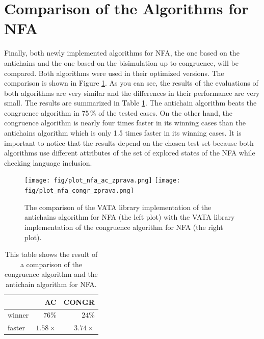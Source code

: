 \section{Comparison of the Algorithms for NFA}
Finally, both newly implemented algorithms for NFA, the one based on the antichains and the one based on the bisimulation up to congruence, will be compared.
Both algorithms were used in their optimized versions.
The comparison is shown in Figure \ref{fig:figPlotNFA}.
As you can see, the results of the evaluations of both algorithms are very similar and the differences in their performance are very small. 
The results are summarized in Table \ref{tabNFA}. The antichain algorithm beats the congruence algorithm in 75\,\% of
the tested cases. On the other hand, the congruence algorithm is nearly four times faster in its winning cases than the antichains algorithm which is
only 1.5 times faster in its winning cases. 
It is important to notice that the results depend on the chosen test set because both algorithms use different attributes
of the set of explored states of the NFA while checking language inclusion.

\begin{figure}[bt]
\begin{center}
\texttt{[image: fig/plot\_nfa\_ac\_zprava.png]}
\texttt{[image: fig/plot\_nfa\_congr\_zprava.png]}
\caption{The comparison of the VATA library implementation of the antichains algorithm for NFA (the left plot)
    with the VATA library implementation of the congruence algorithm for NFA (the right plot).}
\label{fig:figPlotNFA}
\end{center}
\end{figure}

\begin{table}[bt]
\begin{center}
\parbox{.45\linewidth}{
  \begin{tabular}[scale=0.3]{ | l | r | r |}
   \hline
    & \textbf{AC} & \textbf{CONGR} \\ \hline \hline
    winner & $76\%$ & $24\%$ \\ \hline
    faster & $1.58\times$ & $3.74\times$ \\ \hline
   \end{tabular}
}
   \caption{This table shows the result of a comparison of the congruence algorithm and the antichain algorithm for NFA.}
   \label{tabNFA}
\end{center}
\end{table}
\hfill

